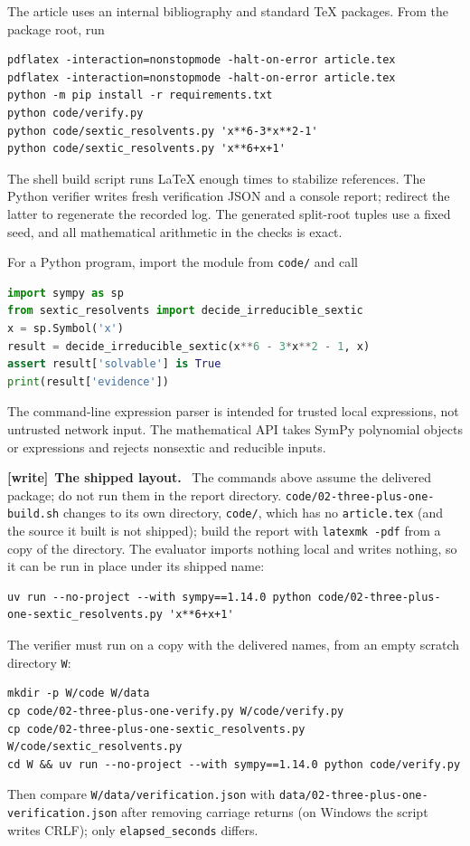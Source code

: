 \documentclass[11pt,letterpaper]{article}
\numberwithin{equation}{section}
\theoremstyle{definition}
\theoremstyle{remark}
\newcommand{\src}[1]{\texttt{\nolinkurl{#1}}}
\newenvironment{writenote}[1][]{\par\smallskip\begingroup\small
 \noindent\textbf{[write]}\if\relax\detokenize{#1}\relax\else~\textbf{#1.}\fi\ }%
 {\par\endgroup\smallskip}
\begin{document}
The article uses an internal bibliography and standard TeX packages. From the
package root, run
\begin{lstlisting}
pdflatex -interaction=nonstopmode -halt-on-error article.tex
pdflatex -interaction=nonstopmode -halt-on-error article.tex
python -m pip install -r requirements.txt
python code/verify.py
python code/sextic_resolvents.py 'x**6-3*x**2-1'
python code/sextic_resolvents.py 'x**6+x+1'
\end{lstlisting}
The shell build script runs LaTeX enough times to stabilize references. The
Python verifier writes fresh verification JSON and a console report; redirect
the latter to regenerate the recorded log. The generated split-root tuples use a
fixed seed, and all mathematical arithmetic in the checks is exact.

For a Python program, import the module from \src{code/} and call
\begin{lstlisting}[language=Python]
import sympy as sp
from sextic_resolvents import decide_irreducible_sextic
x = sp.Symbol('x')
result = decide_irreducible_sextic(x**6 - 3*x**2 - 1, x)
assert result['solvable'] is True
print(result['evidence'])
\end{lstlisting}
The command-line expression parser is intended for trusted local expressions,
not untrusted network input. The mathematical API takes SymPy polynomial
objects or expressions and rejects nonsextic and reducible inputs.

\begin{writenote}[The shipped layout]
The commands above assume the delivered package; do not run them in the
report directory. \src{code/02-three-plus-one-build.sh} changes to its own
directory, \src{code/}, which has no \src{article.tex} (and the source it
built is not shipped); build the report with \src{latexmk -pdf} from a copy
of the directory. The evaluator imports nothing local and writes nothing,
so it can be run in place under its shipped name:
\begin{lstlisting}
uv run --no-project --with sympy==1.14.0 python code/02-three-plus-one-sextic_resolvents.py 'x**6+x+1'
\end{lstlisting}
The verifier must run on a copy with the delivered names, from an empty
scratch directory \src{W}:
\begin{lstlisting}
mkdir -p W/code W/data
cp code/02-three-plus-one-verify.py W/code/verify.py
cp code/02-three-plus-one-sextic_resolvents.py W/code/sextic_resolvents.py
cd W && uv run --no-project --with sympy==1.14.0 python code/verify.py
\end{lstlisting}
Then compare \src{W/data/verification.json} with
\src{data/02-three-plus-one-verification.json} after removing carriage
returns (on Windows the script writes CRLF); only \src{elapsed_seconds}
differs.
\end{writenote}
\end{document}
